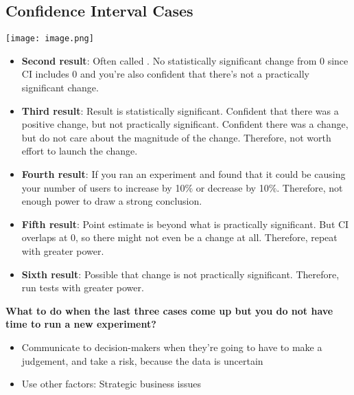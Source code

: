 \documentclass[10pt]{article}
\theoremstyle{definition}
\begin{document}
\subsection{Confidence Interval Cases}

\texttt{[image: image.png]}
\begin{itemize}
    \item \textbf{Second result}: Often called . No statistically significant change from 0 since CI includes 0 and you're also confident that there's not a practically significant change.
    \item \textbf{Third result}: Result is statistically significant. Confident that there was a positive change, but not practically significant. Confident there was a change, but do not care about the magnitude of the change. Therefore, not worth effort to launch the change.
    \item \textbf{Fourth result}: If you ran an experiment and found that it could be causing your number of users to increase by 10$\%$ or decrease by 10$\%$. Therefore, not enough power to draw a strong conclusion.
    \item \textbf{Fifth result}: Point estimate is beyond what is practically significant. But CI overlaps at 0, so there might not even be a change at all. Therefore, repeat with greater power. 
    \item \textbf{Sixth result}: Possible that change is not practically significant. Therefore, run tests with greater power. 
\end{itemize}
\textbf{What to do when the last three cases come up but you do not have time to run a new experiment?}

\begin{itemize}
    \item Communicate to decision-makers when they're going to have to make a judgement, and take a risk, because the data is uncertain
    \item Use other factors: Strategic business issues
\end{itemize}
\end{document}
